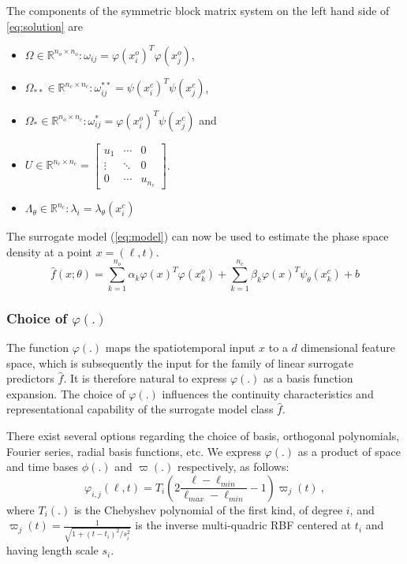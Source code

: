 %
The components of the symmetric block matrix system on the left hand side of \cref{eq:solution} 
are 
%
\begin{itemize}
\item $\Omega \in \mathbb{R}^{n_{o} \times n_{o}}: \omega_{ij} = \varphi(x^{o}_{i})^{T} \varphi(x^{o}_{j})$,
\item $\Omega_{**} \in \mathbb{R}^{n_{c} \times n_{c}}: \omega^{**}_{ij} = \psi(x^{c}_{i})^{T} \psi(x^{c}_{j})$,
\item $\Omega_{*} \in \mathbb{R}^{n_{o} \times n_{c}}: \omega^{*}_{ij} = \varphi(x^{o}_{i})^{T} \psi(x^{c}_{j})$ and 
\item $U \in \mathbb{R}^{n_{c} \times n_{c}} = \begin{bmatrix}
    u_1 & \cdots & 0 \\ 
    \vdots & \ddots  & 0\\ 
    0 & \cdots  & u_{n_{c}} 
  \end{bmatrix}$.
\item $\Lambda_{\theta} \in \mathbb{R}^{n_{c}}: \lambda_{i} = \lambda_{\theta}(x^{c}_{i})$
\end{itemize}
%
The surrogate model (\cref{eq:model}) can now be used to estimate the phase space density at a 
point $x = (\ell,t)$.
%
\begin{equation}\label{eq:model}
\hat{f}(x;\theta) = 
\sum_{k = 1}^{n_{o}}{\alpha_{k}\varphi(x)^{T}\varphi(x^{o}_{k}) + 
\sum_{k = 1}^{n_{c}}}{\beta_{k} \varphi(x)^{T} \psi_{\theta}(x^{c}_{k})} + b
\end{equation}

\subsubsection*{Choice of $\varphi(.)$}\label{sec:basisChoice}

The function $\varphi(.)$ maps the spatiotemporal input $x$ to a $d$ dimensional feature space, 
which is subsequently the input for the family of linear surrogate predictors $\hat{f}$. It is 
therefore natural to express $\varphi(.)$ as a basis function expansion. The choice of $\varphi(.)$ 
influences the continuity characteristics and representational capability of the surrogate model 
class $\hat{f}$.

There exist several options regarding the choice of basis, orthogonal polynomials, Fourier series, 
radial basis functions, etc. We express $\varphi(.)$ as a product of space and time bases 
$\phi(.)$ and $\varpi(.)$ respectively, as follows:
%
\[
  \varphi_{i,j}(\ell,t) = 
    T_{i}\left(2\frac{\ell - \ell_{min}}{\ell_{max} - \ell_{min}} - 1\right) \varpi_{j}(t) \ ,
\]
%
where $T_{i}(.)$ is the Chebyshev polynomial of the first kind, of degree $i$, and 
$\varpi_{j}(t) = \frac{1}{\sqrt{1 + (t - t_i)^{2}/s_{i}^2}}$ is the inverse multi-quadric RBF 
centered at $t_i$ and having length scale $s_i$.   

